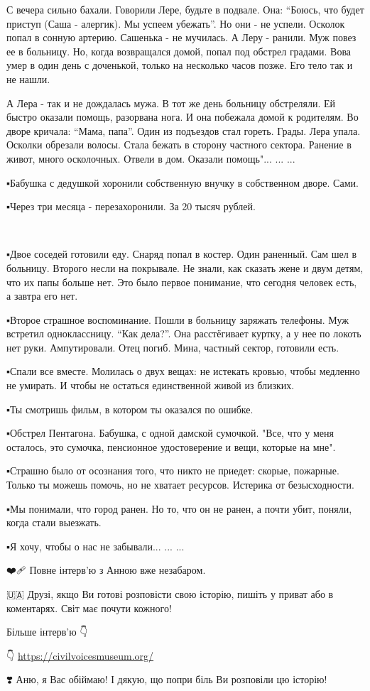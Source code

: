 С вечера сильно бахали. Говорили Лере, будьте в подвале. Она: \enquote{Боюсь, что будет
приступ (Саша - алергик). Мы успеем убежать}. Но они - не успели. Осколок попал
в сонную артерию. Сашенька - не мучилась. А Леру - ранили. Муж повез ее в
больницу. Но, когда возвращался домой, попал под обстрел градами. Вова умер в
один день с доченькой, только на несколько часов позже. Его тело так и не
нашли. 

А Лера - так и не дождалась мужа. В тот же день больницу обстреляли. Ей быстро
оказали помощь, разорвана нога. И она побежала домой к родителям. Во дворе
кричала: \enquote{Мама, папа}. Один из подъездов стал гореть. Грады. Лера упала.
Осколки обрезали волосы. Стала бежать в сторону частного сектора. Ранение в
живот, много осколочных. Отвели в дом. Оказали помощь"... ... ... 

▪️Бабушка с дедушкой хоронили собственную внучку в собственном дворе. Сами. 

▪️Через три месяца - перезахоронили. За 20 тысяч рублей. 

🖤🖤🖤🖤🖤🖤💔💔🖤🖤🖤🖤🖤🖤

▪️Двое соседей готовили еду. Снаряд попал в костер. Один раненный. Сам шел в
больницу. Второго несли на покрывале. Не знали, как сказать жене и двум детям,
что их папы больше нет. Это было первое понимание, что сегодня человек есть, а
завтра его нет. 

▪️Второе страшное воспоминание. Пошли в больницу заряжать телефоны. Муж встретил
одноклассницу. \enquote{Как дела?}. Она расстёгивает куртку, а у нее по локоть нет
руки. Ампутировали. Отец погиб. Мина, частный сектор, готовили есть.

▪️Спали все вместе. Молилась о двух вещах: не истекать кровью, чтобы медленно не
умирать. И чтобы не остаться единственной живой из близких.

▪️Ты смотришь фильм, в котором ты оказался по ошибке. 

▪️Обстрел Пентагона. Бабушка, с одной дамской сумочкой. "Все, что у меня
осталось, это сумочка, пенсионное удостоверение и вещи, которые на мне". 

▪️Страшно было от осознания того, что никто не приедет: скорые, пожарные. Только
ты можешь помочь, но не хватает ресурсов. Истерика от безысходности. 

▪️Мы понимали, что город ранен. Но то, что он не ранен, а почти убит, поняли,
когда стали выезжать. 

▪️Я хочу, чтобы о нас не забывали... ... ... 

❤️🩹 Повне інтерв'ю з Анною вже незабаром. 

🇺🇦 Друзі, якщо Ви готові розповісти свою історію, пишіть у приват або в
коментарях. Світ має почути кожного! 

Більше інтерв'ю 👇

👇
\url{https://civilvoicesmuseum.org/}

❣️ Аню, я Вас обіймаю! І дякую, що попри біль Ви розповіли цю історію!
